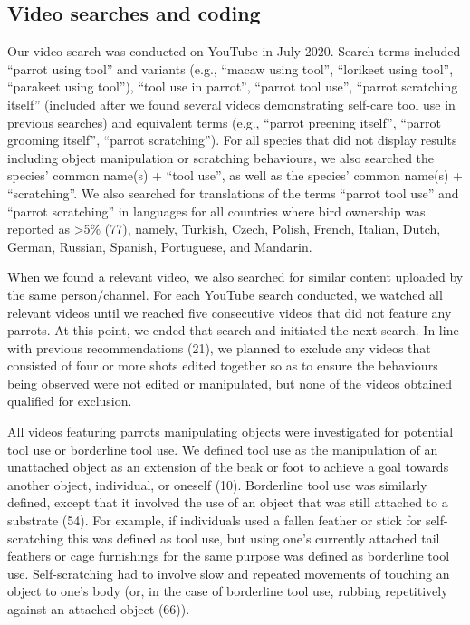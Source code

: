 \documentclass[
  man,floatsintext]{apa6}
\begin{document}
\hypertarget{video-searches-and-coding}{%
\subsection{Video searches and coding}\label{video-searches-and-coding}}

Our video search was conducted on YouTube in July 2020. Search terms included
``parrot using tool'' and variants (e.g., ``macaw using tool'', ``lorikeet using
tool'', ``parakeet using tool''), ``tool use in parrot'', ``parrot tool use'', ``parrot
scratching itself'' (included after we found several videos demonstrating
self-care tool use in previous searches) and equivalent terms (e.g., ``parrot
preening itself'', ``parrot grooming itself'', ``parrot scratching''). For all
species that did not display results including object manipulation or scratching
behaviours, we also searched the species' common name(s) + ``tool use'', as well
as the species' common name(s) + ``scratching''. We also searched for translations
of the terms ``parrot tool use'' and ``parrot scratching'' in languages for all
countries where bird ownership was reported as \textgreater5\% (77), namely,
Turkish, Czech, Polish, French, Italian, Dutch, German, Russian, Spanish,
Portuguese, and Mandarin.

When we found a relevant video, we also searched for similar content uploaded by
the same person/channel. For each YouTube search conducted, we watched all
relevant videos until we reached five consecutive videos that did not feature
any parrots. At this point, we ended that search and initiated the next search.
In line with previous recommendations (21), we planned to exclude any
videos that consisted of four or more shots edited together so as to ensure the
behaviours being observed were not edited or manipulated, but none of the videos
obtained qualified for exclusion.

All videos featuring parrots manipulating objects were investigated for
potential tool use or borderline tool use. We defined tool use as the
manipulation of an unattached object as an extension of the beak or foot to
achieve a goal towards another object, individual, or oneself (10).
Borderline tool use was similarly defined, except that it involved the use of an
object that was still attached to a substrate (54). For example, if
individuals used a fallen feather or stick for self-scratching this was defined
as tool use, but using one's currently attached tail feathers or cage
furnishings for the same purpose was defined as borderline tool use.
Self-scratching had to involve slow and repeated movements of touching an object
to one's body (or, in the case of borderline tool use, rubbing repetitively
against an attached object (66)).
\end{document}
